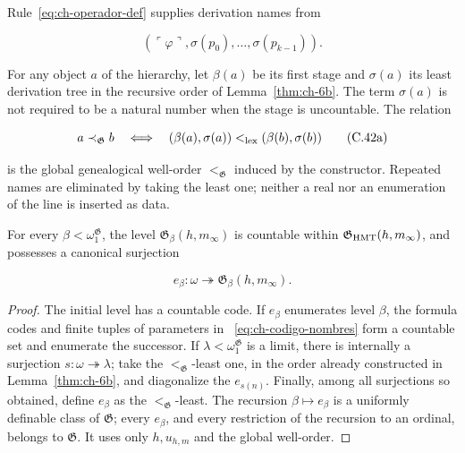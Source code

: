 Rule~\eqref{eq:ch-operador-def} supplies derivation names from

\[
 (\ulcorner\varphi\urcorner,
  \sigma(p_0),\ldots,\sigma(p_{k-1})).
\tag{C.42}\label{eq:ch-codigo-nombres}
\]

For any object \(a\) of the hierarchy, let \(\beta(a)\) be its first stage and
\(\sigma(a)\) its least derivation tree in the recursive order of
Lemma~\ref{thm:ch-6b}. The term \(\sigma(a)\) is not required to be a natural
number when the stage is uncountable. The relation

\[
 a\prec_{\mathfrak G}b
 \quad\Longleftrightarrow\quad
 (\beta(a),\sigma(a))<_{\rm lex}
 (\beta(b),\sigma(b))
\tag{C.42a}\label{eq:ch-orden-genealogico}
\]

is the global genealogical well-order \(<_{\mathfrak G}\) induced by the
constructor. Repeated names are eliminated by taking the least one; neither a
real nor an enumeration of the line is inserted as data.

\begin{lemma}
\label{thm:ch-7}
For every \(\beta<\omega_1^{\mathfrak G}\), the level
\(\mathfrak G_\beta(h,m_\infty)\) is countable within
\(\mathfrak G_{\rm HMT}(h,m_\infty)\), and possesses a canonical surjection

\[
 e_\beta:\omega\twoheadrightarrow
 \mathfrak G_\beta(h,m_\infty).
\tag{C.43}\label{eq:ch-enumeracion-niveles}
\]

\end{lemma}
\begin{proof}
The initial level has a countable code. If \(e_\beta\) enumerates level
\(\beta\), the formula codes and finite tuples of parameters in
~\eqref{eq:ch-codigo-nombres} form a countable set and enumerate the successor.
If \(\lambda<\omega_1^{\mathfrak G}\) is a limit, there is internally a
surjection \(s:\omega\twoheadrightarrow\lambda\); take the
\(<_{\mathfrak G}\)-least one, in the order already constructed in
Lemma~\ref{thm:ch-6b}, and diagonalize the \(e_{s(n)}\). Finally, among all
surjections so obtained, define \(e_\beta\) as the
\(<_{\mathfrak G}\)-least. The recursion \(\beta\mapsto e_\beta\) is a
uniformly definable class of \(\mathfrak G\); every \(e_\beta\), and every
restriction of the recursion to an ordinal, belongs to \(\mathfrak G\). It
uses only \(h,u_{h,m}\) and the global well-order.
\end{proof}

